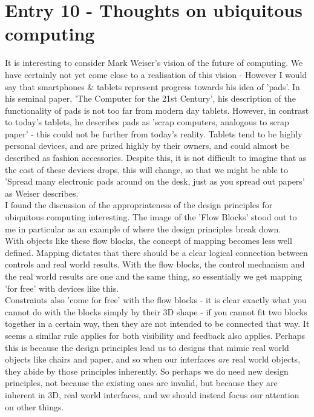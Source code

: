 \documentclass{article}
\begin{document}
\section*{Entry 10 - Thoughts on ubiquitous computing}

\noindent It is interesting to consider Mark Weiser's vision of the future of computing. We have certainly not yet come close to a realisation of this vision - However I would say that smartphones \& tablets represent progress towards his idea of 'pads'. In his seminal paper, 'The Computer for the 21st Century', his description of the functionality of pads is not too far from modern day tablets. However, in contrast to today's tablets, he describes pads as 'scrap computers, analogous to scrap paper' - this could not be further from today's reality. Tablets tend to be highly personal devices, and are prized highly by their owners, and could almost be described as fashion accessories. Despite this, it is not difficult to imagine that as the cost of these devices drops, this will change, so that we might be able to 'Spread many electronic pads around on the desk, just as you spread out papers' as Weiser describes.
\\\indent I found the discussion of the appropriateness of the design principles for ubiquitous computing interesting. The image of the 'Flow Blocks' stood out to me in particular as an example of where the design principles break down.
\\\indent With objects like these flow blocks, the concept of mapping becomes less well defined. Mapping dictates that there should be a clear logical connection between controls and real world results. With the flow blocks, the control mechanism and the real world results are one and the same thing, so essentially we get mapping 'for free' with devices like this.
\\\indent Constraints also 'come for free' with the flow blocks - it is clear exactly what you cannot do with the blocks simply by their 3D shape - if you cannot fit two blocks together in a certain way, then they are not intended to be connected that way. It seems a similar rule applies for both visibility and feedback also applies. Perhaps this is because the design principles lead us to designs that mimic real world objects like chairs and paper, and so when our interfaces \emph{are} real world objects, they abide by those principles inherently. So perhaps we do need new design principles, not because the existing ones are invalid, but because they are inherent in 3D, real world interfaces, and we should instead focus our attention on other things.
\end{document}
